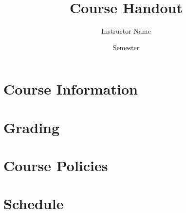 \documentclass[12pt]{article}
\begin{document}
\title{Course Handout}
\author{Instructor Name}
\date{Semester}
\maketitle

\section*{Course Information}

\section*{Grading}

\section*{Course Policies}

\section*{Schedule}
\end{document}
